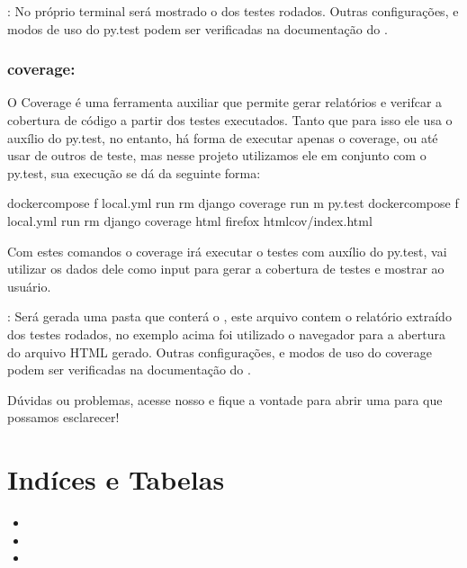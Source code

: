 \documentclass[letterpaper,10pt,english]{sphinxmanual}
\begin{document}
: No próprio terminal será mostrado o  dos testes rodados. Outras configurações,  e modos de uso do py.test podem ser verificadas na documentação do .


\subsection{coverage:}
\label{\detokenize{tests:coverage}}
O Coverage é uma ferramenta auxiliar que permite gerar relatórios e verifcar a cobertura de código a partir dos testes executados. Tanto que para isso ele usa o auxílio do py.test, no entanto, há forma de executar apenas o coverage, ou até usar de outros  de teste, mas nesse projeto utilizamos ele em conjunto com o py.test, sua execução se dá da seguinte forma:

\begin{sphinxVerbatim}[commandchars=\\\{\}]
\PYGZdl{} docker\PYGZhy{}compose \PYGZhy{}f local.yml run \PYGZhy{}\PYGZhy{}rm django coverage run \PYGZhy{}m py.test
\PYGZdl{} docker\PYGZhy{}compose \PYGZhy{}f local.yml run \PYGZhy{}\PYGZhy{}rm django coverage html
\PYGZdl{} firefox htmlcov/index.html
\end{sphinxVerbatim}

Com estes comandos o coverage irá executar o testes com auxílio do py.test, vai utilizar os dados dele como input para gerar a cobertura de testes e mostrar ao usuário.

: Será gerada uma pasta  que conterá o , este arquivo contem o relatório extraído dos testes rodados, no exemplo acima foi utilizado o navegador  para a abertura do arquivo HTML gerado. Outras configurações,  e modos de uso do coverage podem ser verificadas na documentação do .

Dúvidas ou problemas, acesse nosso  e fique a vontade para abrir uma  para que possamos esclarecer!


\chapter{Indíces e Tabelas}
\label{\detokenize{index:indices-e-tabelas}}\begin{itemize}
\item {} 

\item {} 

\item {} 

\end{itemize}



\renewcommand{\indexname}{Index}
\printindex
\end{document}
